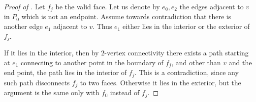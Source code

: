 
\begin{proof}[Proof of ]
    Let \(f_j\) be the valid face. Let us denote by \(e_0,e_2\) the edges adjacent to \(v\) in \(P_0\) which is not an endpoint. Assume towards contradiction that there is another edge \(e_1\) adjacent to \(v\). Thus \(e_1\) either lies in the interior or the exterior of \(f_j\).

    If it lies in the interior, then by \(2\)-vertex connectivity there exists a path starting at \(e_1\) connecting to another point in the boundary of \(f_{j}\), and other than \(v\) and the end point, the path lies in the interior of \(f_{j}\). This is a contradiction, since any such path disconnects \(f_{j}\) to two faces. Otherwise it lies in the exterior, but the argument is the same only with \(f_0\) instead of \(f_j\). %
\end{proof}

